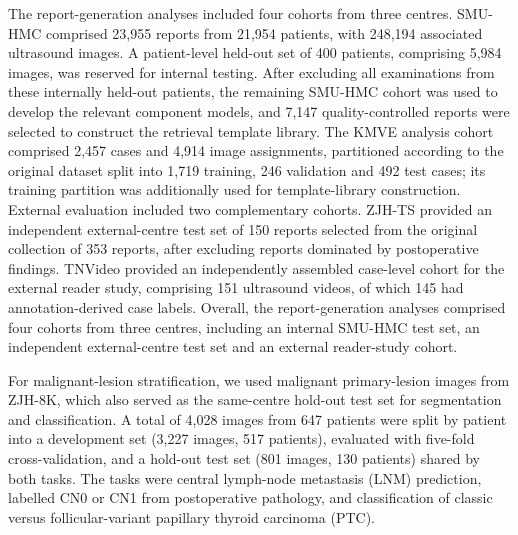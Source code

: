 \documentclass[fleqn,10pt]{wlscirep}
\begin{document}
The report-generation analyses included four cohorts from three centres. SMU-HMC comprised 23,955 reports from 21,954 patients, with 248,194 associated ultrasound images. A patient-level held-out set of 400 patients, comprising 5,984 images, was reserved for internal testing. After excluding all examinations from these internally held-out patients, the remaining SMU-HMC cohort was used to develop the relevant component models, and 7,147 quality-controlled reports were selected to construct the retrieval template library. The KMVE analysis cohort~\cite{li_ultrasound_2024} comprised 2,457 cases and 4,914 image assignments, partitioned according to the original dataset split into 1,719 training, 246 validation and 492 test cases; its training partition was additionally used for template-library construction. External evaluation included two complementary cohorts. ZJH-TS provided an independent external-centre test set of 150 reports selected from the original collection of 353 reports, after excluding reports dominated by postoperative findings. TNVideo provided an independently assembled case-level cohort for the external reader study, comprising 151 ultrasound videos, of which 145 had annotation-derived case labels. Overall, the report-generation analyses comprised four cohorts from three centres, including an internal SMU-HMC test set, an independent external-centre test set and an external reader-study cohort.

For malignant-lesion stratification, we used malignant primary-lesion images from ZJH-8K, which also served as the same-centre hold-out test set for segmentation and classification. A total of 4,028 images from 647 patients were split by patient into a development set (3,227 images, 517 patients), evaluated with five-fold cross-validation, and a hold-out test set (801 images, 130 patients) shared by both tasks. The tasks were central lymph-node metastasis (LNM) prediction, labelled CN0 or CN1 from postoperative pathology, and classification of classic versus follicular-variant papillary thyroid carcinoma (PTC).
\end{document}
